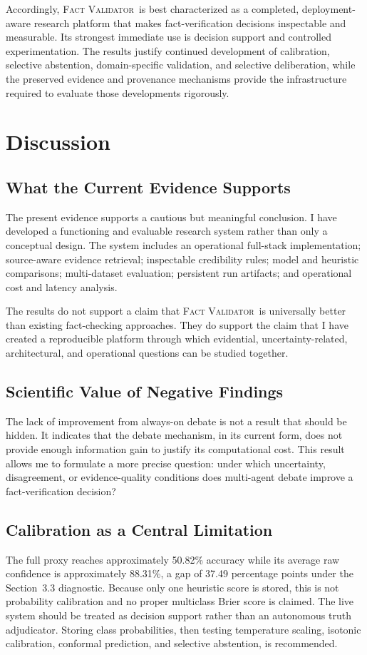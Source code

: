 \documentclass[12pt,a4paper,openany]{report}
\newcommand{\system}{\textsc{Fact Validator}}
\begin{document}
Accordingly, \system\ is best characterized as a completed, deployment-aware
research platform that makes fact-verification decisions inspectable and
measurable. Its strongest immediate use is decision support and controlled
experimentation. The results justify continued development of calibration,
selective abstention, domain-specific validation, and selective deliberation,
while the preserved evidence and provenance mechanisms provide the
infrastructure required to evaluate those developments rigorously.

\chapter{Discussion}
\section{What the Current Evidence Supports}
The present evidence supports a cautious but meaningful conclusion. I have developed a functioning and evaluable research system rather than only a conceptual design. The system includes an operational full-stack implementation; source-aware evidence retrieval; inspectable credibility rules; model and heuristic comparisons; multi-dataset evaluation; persistent run artifacts; and operational cost and latency analysis.

The results do not support a claim that \system\ is universally better than existing fact-checking approaches. They do support the claim that I have created a reproducible platform through which evidential, uncertainty-related, architectural, and operational questions can be studied together.

\section{Scientific Value of Negative Findings}
The lack of improvement from always-on debate is not a result that should be hidden. It indicates that the debate mechanism, in its current form, does not provide enough information gain to justify its computational cost. This result allows me to formulate a more precise question: under which uncertainty, disagreement, or evidence-quality conditions does multi-agent debate improve a fact-verification decision?

\section{Calibration as a Central Limitation}
The full proxy reaches approximately 50.82\% accuracy while its average raw confidence is approximately 88.31\%, a gap of 37.49 percentage points under the Section~3.3 diagnostic. Because only one heuristic score is stored, this is not probability calibration and no proper multiclass Brier score is claimed. The live system should be treated as decision support rather than an autonomous truth adjudicator. Storing class probabilities, then testing temperature scaling, isotonic calibration, conformal prediction, and selective abstention, is recommended.
\end{document}
